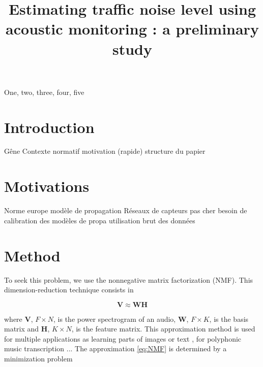 \documentclass{article}
\title{Estimating traffic noise level using acoustic monitoring : a preliminary study}
\begin{document}
\ninept
\maketitle

\begin{sloppy}

\begin{abstract}
\end{abstract}

\begin{keywords}
One, two, three, four, five
\end{keywords}

\section{Introduction}
\label{sec:intro}

Gêne 
Contexte normatif
motivation (rapide)
structure du papier


\section{Motivations}
\label{sec:format}

Norme europe
modèle de propagation
Réseaux de capteurs pas cher
besoin de calibration des modèles de propa
utilisation brut des données

\section{Method}
To seek this problem, we use the nonnegative matrix factorization \cite{lee1999} (NMF). This dimension-reduction technique consists in 

\begin{equation}\label{eq:NMF}
\mathbf{V} \approx \mathbf{WH}
\end{equation}

where $\mathbf{V}$, $F \times N$, is the power spectrogram of an audio, $\mathbf{W}$, $F \times K$, is the basis matrix and $\mathbf{H}$, $K \times N$, is the feature matrix. This approximation method is used for multiple applications as learning parts of images or text \cite{lee1999}, for polyphonic music transcription \cite{smaragdis2003}...
The approximation \ref{eq:NMF} is determined by a minimization problem


\end{sloppy}
\end{document}
